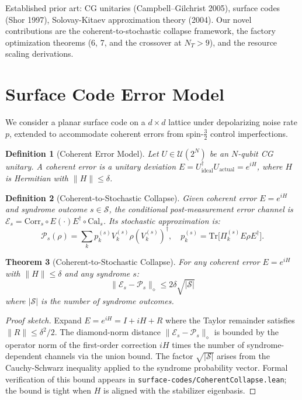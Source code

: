 \documentclass[11pt]{article}
\newtheorem{theorem}{Theorem}[section]
\newtheorem{definition}[theorem]{Definition}
\begin{document}
Established prior art: CG unitaries (Campbell--Gilchrist 2005), surface codes (Shor 1997),
Solovay-Kitaev approximation theory (2004). Our novel contributions are the
coherent-to-stochastic collapse framework, the factory optimization theorems (6, 7, and the
crossover at $N_T > 9$), and the resource scaling derivations.

\section{Surface Code Error Model}
\label{sec:error}

We consider a planar surface code on a $d \times d$ lattice under depolarizing noise rate $p$,
extended to accommodate coherent errors from spin-$\tfrac{3}{2}$ control imperfections.

\begin{definition}[Coherent Error Model]
\label{def:coherent}
Let $U \in \mathcal{U}(2^N)$ be an $N$-qubit CG unitary. A coherent error is a unitary
deviation $E = U_{\mathrm{ideal}}^\dagger U_{\mathrm{actual}} = e^{iH}$, where $H$ is
Hermitian with $\|H\| \leq \delta$.
\end{definition}

\begin{definition}[Coherent-to-Stochastic Collapse]
\label{def:collapse}
Given coherent error $E = e^{iH}$ and syndrome outcome $s \in \mathcal{S}$, the
conditional post-measurement error channel is
$\mathcal{E}_s = \mathrm{Corr}_s \circ E(\cdot)E^\dagger \circ \mathrm{Cal}_s$.
Its stochastic approximation is:
\[
\mathcal{P}_s(\rho) = \sum_k p_k^{(s)} V_k^{(s)} \rho (V_k^{(s)})^\dagger,
\quad p_k^{(s)} = \mathrm{Tr}\bigl[\Pi_k^{(s)} E\rho E^\dagger\bigr].
\]
\end{definition}

\begin{theorem}[Coherent-to-Stochastic Collapse]
\label{thm:collapse}
For any coherent error $E = e^{iH}$ with $\|H\| \leq \delta$ and any syndrome $s$:
\[
\|\mathcal{E}_s - \mathcal{P}_s\|_\diamond \leq 2\delta\sqrt{|\mathcal{S}|}
\]
where $|\mathcal{S}|$ is the number of syndrome outcomes.
\end{theorem}
\begin{proof}[Proof sketch]
Expand $E = e^{iH} = I + iH + R$ where the Taylor remainder satisfies $\|R\| \leq \delta^2/2$.
The diamond-norm distance $\|\mathcal{E}_s - \mathcal{P}_s\|_\diamond$ is bounded by the
operator norm of the first-order correction $iH$ times the number of syndrome-dependent
channels via the union bound. The factor $\sqrt{|\mathcal{S}|}$ arises from the Cauchy-Schwarz
inequality applied to the syndrome probability vector. Formal verification of this bound
appears in \texttt{surface-codes/CoherentCollapse.lean}; the bound is tight when $H$ is
aligned with the stabilizer eigenbasis.
\end{proof}
\end{document}
